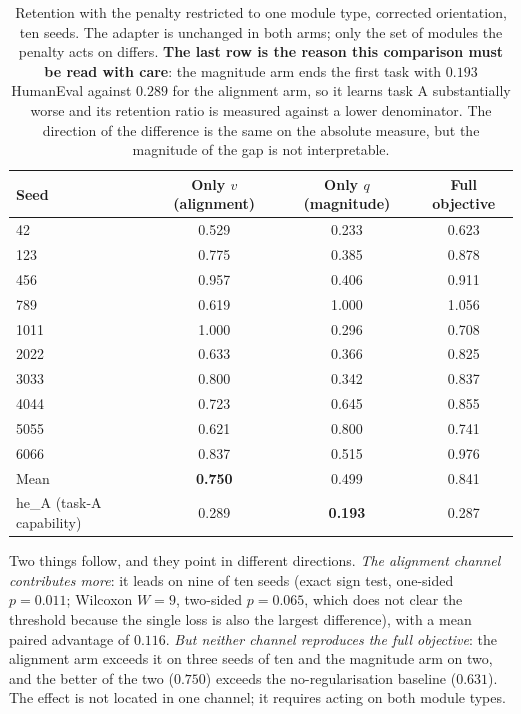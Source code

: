 \documentclass[11pt,a4paper]{article}
\begin{document}
\begin{table}[h]
\centering
\small
\begin{tabular}{lccc}
\hline
Seed & Only $v$ (alignment) & Only $q$ (magnitude) & Full objective \\
\hline
42 & 0.529 & 0.233 & 0.623 \\
123 & 0.775 & 0.385 & 0.878 \\
456 & 0.957 & 0.406 & 0.911 \\
789 & 0.619 & 1.000 & 1.056 \\
1011 & 1.000 & 0.296 & 0.708 \\
2022 & 0.633 & 0.366 & 0.825 \\
3033 & 0.800 & 0.342 & 0.837 \\
4044 & 0.723 & 0.645 & 0.855 \\
5055 & 0.621 & 0.800 & 0.741 \\
6066 & 0.837 & 0.515 & 0.976 \\
\hline
Mean & \textbf{0.750} & 0.499 & 0.841 \\
\hline
he\_A (task-A capability) & 0.289 & \textbf{0.193} & 0.287 \\
\hline
\end{tabular}
\caption{Retention with the penalty restricted to one module type, corrected
orientation, ten seeds. The adapter is unchanged in both arms; only the set of
modules the penalty acts on differs. \textbf{The last row is the reason this
comparison must be read with care}: the magnitude arm ends the first task with
$0.193$ HumanEval against $0.289$ for the alignment arm, so it learns task A
substantially worse and its retention ratio is measured against a lower
denominator. The direction of the difference is the same on the absolute
measure, but the magnitude of the gap is not interpretable.}
\label{tab:ablation}
\end{table}

Two things follow, and they point in different directions. \emph{The alignment
channel contributes more}: it leads on nine of ten seeds (exact sign test,
one-sided $p=0.011$; Wilcoxon $W=9$, two-sided $p=0.065$, which does not clear
the threshold because the single loss is also the largest difference), with a
mean paired advantage of $0.116$. \emph{But neither channel reproduces the full
objective}: the alignment arm exceeds it on three seeds of ten and the
magnitude arm on two, and the better of the two ($0.750$) exceeds the
no-regularisation baseline ($0.631$). The effect is not located in one channel;
it requires acting on both module types.
\end{document}

